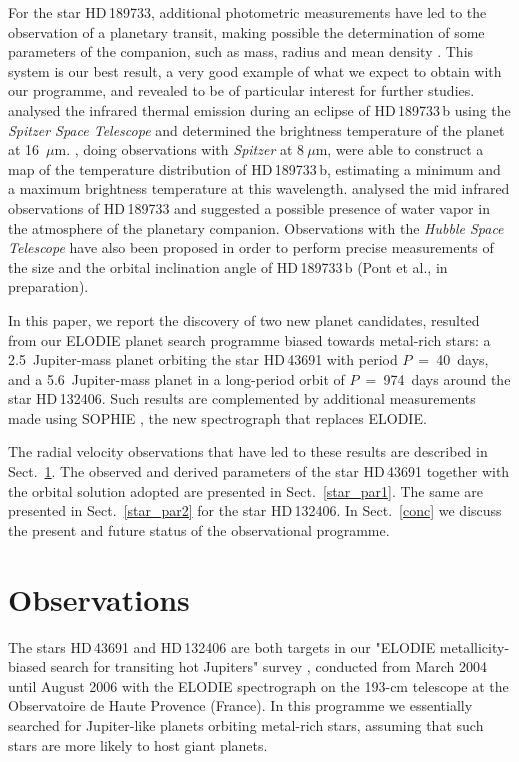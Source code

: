 \documentclass{aa}
\begin{document}
For the star HD\,189733, additional photometric measurements have led to the
observation of a planetary transit, making possible the determination of
some parameters of the companion, such as mass, radius and mean density
\citep{Bouchyetal2005,Bakosetal2006,Winnetal2007}. This system is our best
result, a very good example of what we expect to obtain with our programme,
and revealed to be of particular interest for further studies.
\citet{Demingetal2006} analysed the infrared thermal emission during an
eclipse of HD\,189733\,b using the {\it Spitzer Space Telescope}
\citep{Werneretal2004} and determined the brightness temperature of the
planet at 16~$\mu$m. \citet{Knutsonetal2007}, doing observations with
{\it Spitzer} at $8~\mu$m, were able to construct a map of the temperature
distribution of HD\,189733\,b, estimating a minimum and a maximum brightness
temperature at this wavelength. \citet{FortneyMarley2007} analysed the mid
infrared observations of HD\,189733 and suggested a possible presence of
water vapor in the atmosphere of the planetary companion. Observations with
the {\it Hubble Space Telescope} have also been proposed in order to
perform precise measurements of the size and the orbital inclination angle
of HD\,189733\,b (Pont et al., in preparation).

In this paper, we report the discovery of two new planet candidates,
resulted from our ELODIE planet search programme biased towards metal-rich
stars: a 2.5~Jupiter-mass planet orbiting the star HD\,43691 with period
$P$~=~40~days, and a 5.6~Jupiter-mass planet in a long-period orbit of
$P$~=~974~days around the star HD\,132406. Such results are complemented by
additional measurements made using SOPHIE \citep{Bouchyetal2006}, the new
spectrograph that replaces ELODIE.

The radial velocity observations that have led to these results are
described in Sect.~\ref{obs}. The observed and derived parameters of the
star HD\,43691 together with the orbital solution adopted are presented in
Sect.~\ref{star_par1}. The same are presented in Sect.~\ref{star_par2} for
the star HD\,132406. In Sect.~\ref{conc} we discuss the present and future
status of the observational programme.
\section{Observations}
\label{obs}
The stars HD\,43691 and HD\,132406 are both targets in our "ELODIE
metallicity-biased search for transiting hot Jupiters" survey
\citep{DaSilvaetal2006}, conducted from March 2004 until August 2006 with
the ELODIE spectrograph \citep{Baranneetal1996} on the 193-cm telescope at
the Observatoire de Haute Provence (France). In this programme we
essentially searched for Jupiter-like planets orbiting metal-rich stars,
assuming that such stars are more likely to host giant planets.
\end{document}
